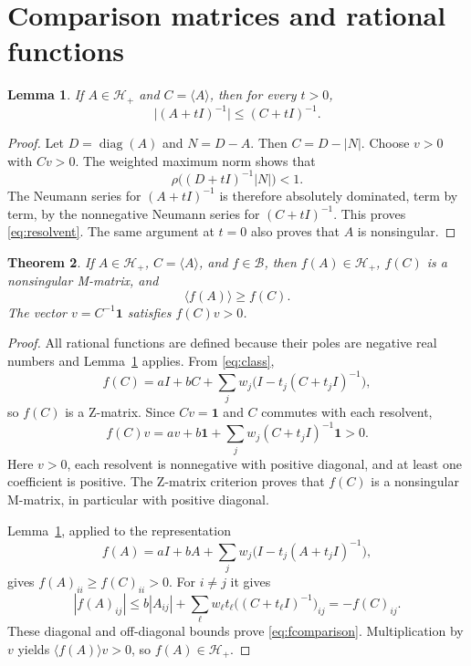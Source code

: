 \documentclass[11pt]{article}
\newtheorem{theorem}{Theorem}
\newtheorem{lemma}[theorem]{Lemma}
\newcommand{\comp}[1]{\langle #1\rangle}
\newcommand{\ones}{\mathbf 1}
\newcommand{\diag}{\operatorname{diag}}
\begin{document}
\section{Comparison matrices and rational functions}
\begin{lemma}\label{lem:resolvent}
If $A\in\mathcal H_+$ and $C=\comp A$, then for every $t>0$,
\begin{equation}\label{eq:resolvent}
\bigl|(A+tI)^{-1}\bigr|\le (C+tI)^{-1}.
\end{equation}
\end{lemma}
\begin{proof}
Let $D=\diag(A)$ and $N=D-A$. Then $C=D-|N|$. Choose $v>0$ with $Cv>0$. The weighted maximum norm shows that
\[
\rho\bigl((D+tI)^{-1}|N|\bigr)<1.
\]
The Neumann series for $(A+tI)^{-1}$ is therefore absolutely dominated, term by term, by the nonnegative Neumann series for $(C+tI)^{-1}$. This proves \eqref{eq:resolvent}. The same argument at $t=0$ also proves that $A$ is nonsingular.
\end{proof}

\begin{theorem}\label{thm:preserver}
If $A\in\mathcal H_+$, $C=\comp A$, and $f\in\mathcal B$, then $f(A)\in\mathcal H_+$, $f(C)$ is a nonsingular M-matrix, and
\begin{equation}\label{eq:fcomparison}
\comp{f(A)}\ge f(C).
\end{equation}
The vector $v=C^{-1}\ones$ satisfies $f(C)v>0$.
\end{theorem}
\begin{proof}
All rational functions are defined because their poles are negative real numbers and Lemma~\ref{lem:resolvent} applies. From \eqref{eq:class},
\[
f(C)=aI+bC+\sum_jw_j\bigl(I-t_j(C+t_jI)^{-1}\bigr),
\]
so $f(C)$ is a Z-matrix. Since $Cv=\ones$ and $C$ commutes with each resolvent,
\[
f(C)v=av+b\ones+\sum_jw_j(C+t_jI)^{-1}\ones>0.
\]
Here $v>0$, each resolvent is nonnegative with positive diagonal, and at least one coefficient is positive. The Z-matrix criterion proves that $f(C)$ is a nonsingular M-matrix, in particular with positive diagonal.

Lemma~\ref{lem:resolvent}, applied to the representation
\[
f(A)=aI+bA+\sum_jw_j\bigl(I-t_j(A+t_jI)^{-1}\bigr),
\]
gives $f(A)_{ii}\ge f(C)_{ii}>0$. For $i\ne j$ it gives
\[
|f(A)_{ij}|\le b|A_{ij}|+\sum_{\ell} w_{\ell}t_{\ell}\bigl((C+t_{\ell}I)^{-1}\bigr)_{ij}
=-f(C)_{ij}.
\]
These diagonal and off-diagonal bounds prove \eqref{eq:fcomparison}. Multiplication by $v$ yields $\comp{f(A)}v>0$, so $f(A)\in\mathcal H_+$.
\end{proof}
\end{document}
